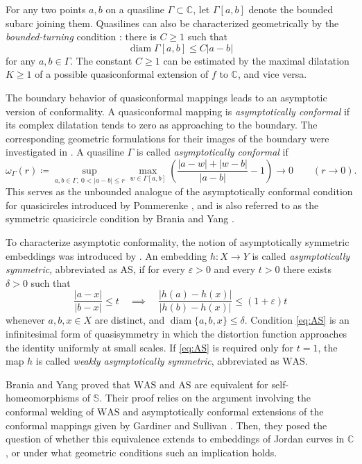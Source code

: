 \documentclass[11pt]{amsart}
\numberwithin{equation}{section}
\theoremstyle{definition} %
\theoremstyle{remarkstyle}
\newcommand{\C}{\mathbb{C}}
\newcommand{\diam}{\operatorname{diam}}
\begin{document}
For any two points $a,b$ on a quasiline $\Gamma \subset \mathbb C$, let $\Gamma[a,b]$ denote the bounded subarc joining them. 
Quasilines can also be characterized geometrically by the \emph{bounded-turning} condition \cite{Ahlfors}: there is $C\ge1$ such that
\[
 \diam\Gamma[a,b]\leq C|a-b|
\]
for any $a,b\in\Gamma$. 
The constant $C \geq 1$ can be estimated by the maximal dilatation $K \geq 1$ of a possible quasiconformal extension of $f$ to $\C$, and vice versa.

The boundary behavior of quasiconformal mappings leads to an asymptotic version of conformality.  
A quasiconformal mapping is \emph{asymptotically conformal} if its complex dilatation tends to zero as approaching to the boundary.   
The corresponding geometric formulations for their images of the boundary were investigated in \cite{Car67,GS,P}. 
A quasiline $\Gamma$ is called \emph{asymptotically conformal} if
\begin{equation} \label{def:symmetric-quasiline}
\omega_{\Gamma}(r)\coloneqq\sup_{a,b\in\Gamma,\ 0<|a-b|\leq r}\max_{w\in\Gamma[a,b]}\left(\frac{|a-w|+|w-b|}{|a-b|}-1\right)\to0\qquad(r\to0).
\end{equation}
This serves as the unbounded analogue of the asymptotically conformal condition for quasicircles introduced by Pommerenke \cite{P}, and is also referred to as the symmetric quasicircle condition by Brania and Yang \cite{BraniaYang}.

To characterize asymptotic conformality, the notion of asymptotically symmetric embeddings
was introduced by
\cite[Definition~2.1]{BraniaYang}. An embedding $h\colon X\to Y$ is called \emph{asymptotically symmetric}, abbreviated as $\mathrm{AS}$, if for every $\varepsilon>0$ and every $t>0$ there exists $\delta>0$ such that
\begin{equation}\label{eq:AS}
 \frac{|a-x|}{|b-x|}\leq t\quad\implies\quad\frac{|h(a)-h(x)|}{|h(b)-h(x)|}\le(1+\varepsilon)t
\end{equation}
whenever $a,b,x\in X$ are distinct, and
$\diam\{a,b,x\}\leq\delta$. 
Condition \eqref{eq:AS} is an infinitesimal form of quasisymmetry in which the distortion function approaches the identity uniformly at small scales. 
If \eqref{eq:AS} is required only for $t=1$, the map $h$ is called \emph{weakly asymptotically symmetric}, abbreviated as $\mathrm{WAS}$.

Brania and Yang \cite[Section~4]{BraniaYang} proved that $\mathrm{WAS}$ and $\mathrm{AS}$ are equivalent for self-homeomor\-phisms of $\mathbb S$.
Their proof relies on the argument involving the conformal welding of $\mathrm{WAS}$ and asymptotically conformal extensions of the conformal mappings given by Gardiner and Sullivan \cite[Theorem 6.3]{GS}.
Then, they posed the question of whether this equivalence extends to embeddings of Jordan curves in $\mathbb C$, or under what geometric conditions such an implication holds. 
\end{document}
